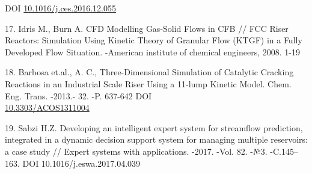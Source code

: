 \begin{references}
DOI
\href{http://dx.doi.org/10.1016/j.ces.2016.12.055}{10.1016/j.ces.2016.12.055}

17. Idris M., Burn A. CFD Modelling Gas-Solid Flows in CFB // FCC Riser
Reactors: Simulation Using Kinetic Theory of Granular Flow (KTGF) in a
Fully Developed Flow Situation. -American institute of chemical
engineers, 2008. 1-19

18. Barbosa et.al., A. C., Three-Dimensional Simulation of Catalytic
Cracking Reactions in an Industrial Scale Riser Using a 11-lump Kinetic
Model. Chem. Eng. Trans. -2013.- 32. -P. 637-642 DOI
\\\href{http://dx.doi.org/10.3303/ACOS1311004}{10.3303/ACOS1311004}

19. Sabzi H.Z. Developing an intelligent expert system for streamflow
prediction, integrated in a dynamic decision support system for managing
multiple reservoirs: a case study // Expert systems with applications.
-2017. -Vol. 82. -№3. -C.145--163. DOI 10.1016/j.eswa.2017.04.039
\end{references}

